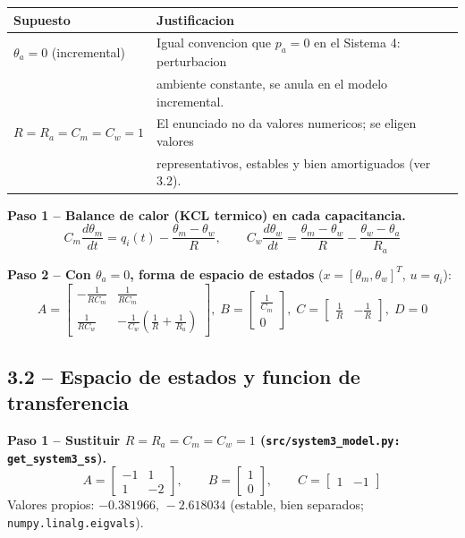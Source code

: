 \documentclass[11pt]{article}
\begin{document}
\begin{center}
\begin{tabular}{@{}ll@{}}
\toprule
Supuesto & Justificacion \\
\midrule
$\theta_a=0$ (incremental) & Igual convencion que $p_a=0$ en el Sistema 4: perturbacion \\
& ambiente constante, se anula en el modelo incremental. \\
$R=R_a=C_m=C_w=1$ & El enunciado no da valores numericos; se eligen valores \\
& representativos, estables y bien amortiguados (ver 3.2). \\
\bottomrule
\end{tabular}
\end{center}

\textbf{Paso 1 -- Balance de calor (KCL termico) en cada capacitancia.}
\begin{equation}
C_m\frac{d\theta_m}{dt}=q_i(t)-\frac{\theta_m-\theta_w}{R},\qquad
C_w\frac{d\theta_w}{dt}=\frac{\theta_m-\theta_w}{R}-\frac{\theta_w-\theta_a}{R_a}
\end{equation}

\textbf{Paso 2 -- Con $\theta_a=0$, forma de espacio de estados} ($x=[\theta_m,\theta_w]^T$, $u=q_i$):
\begin{equation}
A=\begin{bmatrix}-\frac{1}{RC_m}&\frac{1}{RC_m}\\[2pt]\frac{1}{RC_w}&-\frac{1}{C_w}\left(\frac{1}{R}+\frac{1}{R_a}\right)\end{bmatrix},\;
B=\begin{bmatrix}\frac{1}{C_m}\\0\end{bmatrix},\;
C=\begin{bmatrix}\frac{1}{R}&-\frac{1}{R}\end{bmatrix},\;D=0
\end{equation}

\subsection{3.2 -- Espacio de estados y funcion de transferencia}

\textbf{Paso 1 -- Sustituir $R=R_a=C_m=C_w=1$ (\texttt{src/system3\_model.py: get\_system3\_ss}).}
\begin{equation}
A=\begin{bmatrix}-1&1\\1&-2\end{bmatrix},\qquad B=\begin{bmatrix}1\\0\end{bmatrix},\qquad C=\begin{bmatrix}1&-1\end{bmatrix}
\end{equation}
Valores propios: $-0.381966,\,-2.618034$ (estable, bien separados; \texttt{numpy.linalg.eigvals}).
\end{document}
